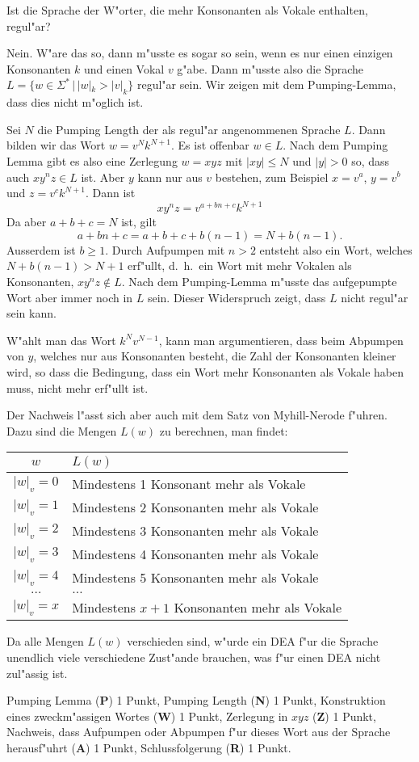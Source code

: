 Ist die Sprache der W"orter, die mehr Konsonanten als Vokale enthalten,
regul"ar?

\begin{loesung}
Nein. W"are das so, dann m"usste es sogar so sein, wenn es nur einen
einzigen Konsonanten $k$ und einen Vokal $v$ g"abe.
Dann m"usste also die Sprache $L=\{ w\in\Sigma^*\,|\, |w|_k > |v|_k\}$
regul"ar sein. Wir zeigen mit dem Pumping-Lemma, dass dies nicht m"oglich
ist.

Sei $N$ die Pumping Length der als regul"ar angenommenen Sprache $L$.
Dann bilden wir das Wort $w=v^{N}k^{N+1}$. Es ist offenbar $w\in L$.
Nach dem Pumping Lemma gibt es also eine Zerlegung $w=xyz$ mit
$|xy|\le N$ und $|y|>0$ so, dass auch $xy^nz\in L$ ist.
Aber $y$ kann nur aus $v$ bestehen, zum Beispiel $x=v^a$, $y=v^b$ und
$z=v^ck^{N+1}$. Dann ist
\[
xy^nz=v^{a+bn+c}k^{N+1}
\]
Da aber $a+b+c=N$ ist, gilt
\[
a+bn+c=a+b+c + b(n-1)=N+b(n-1).
\]
Ausserdem ist $b\ge 1$.
Durch Aufpumpen mit $n> 2$ entsteht also ein Wort, welches
$N+b(n-1)> N+1$ erf"ullt, d.~h.~ein Wort mit mehr Vokalen als
Konsonanten, $xy^nz\not\in L$. Nach dem Pumping-Lemma m"usste das
aufgepumpte Wort aber immer noch in $L$ sein. Dieser Widerspruch
zeigt, dass $L$ nicht regul"ar sein kann.

W"ahlt man das Wort $k^Nv^{N-1}$, kann man argumentieren, dass
beim Abpumpen von $y$, welches nur aus Konsonanten besteht, die
Zahl der Konsonanten kleiner wird, so dass die Bedingung, dass ein
Wort mehr Konsonanten als Vokale haben muss, nicht mehr erf"ullt ist.

Der Nachweis l"asst sich aber auch mit dem Satz von Myhill-Nerode
f"uhren. Dazu sind die Mengen $L(w)$ zu berechnen, man findet:
\begin{center}
\begin{tabular}{|c|l|}
\hline
$w$&$L(w)$\\
\hline
$|w|_v=0$&Mindestens 1 Konsonant mehr als Vokale\\
$|w|_v=1$&Mindestens 2 Konsonanten mehr als Vokale\\
$|w|_v=2$&Mindestens 3 Konsonanten mehr als Vokale\\
$|w|_v=3$&Mindestens 4 Konsonanten mehr als Vokale\\
$|w|_v=4$&Mindestens 5 Konsonanten mehr als Vokale\\
$\dots$&$\dots$\\
$|w|_v=x$&Mindestens $x+1$ Konsonanten mehr als Vokale\\
\hline
\end{tabular}
\end{center}
Da alle Mengen $L(w)$ verschieden sind, w"urde ein DEA f"ur die Sprache
unendlich viele verschiedene Zust"ande brauchen, was f"ur einen
DEA nicht zul"assig ist.
\end{loesung}

\begin{bewertung}
Pumping Lemma ({\bf P}) 1 Punkt,
Pumping Length ({\bf N}) 1 Punkt,
Konstruktion eines zweckm"assigen Wortes ({\bf W}) 1 Punkt,
Zerlegung in $xyz$ ({\bf Z}) 1 Punkt,
Nachweis, dass Aufpumpen oder Abpumpen f"ur dieses Wort aus der Sprache
herausf"uhrt
({\bf A}) 1 Punkt,
Schlussfolgerung ({\bf R}) 1 Punkt.
\end{bewertung}

